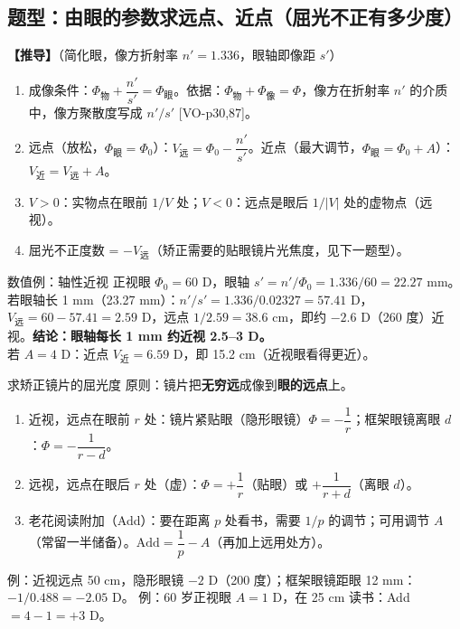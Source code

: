 \subsection{题型：由眼的参数求远点、近点（屈光不正有多少度）}\label{sec:farpoint}
\textbf{【推导】}（简化眼，像方折射率 $n'=1.336$，眼轴即像距 $s'$）
\begin{enumerate}
\item 成像条件：$\Phi_{\text{物}}+\dfrac{n'}{s'}=\Phi_{\text{眼}}$。依据：$\Phi_{\text{物}}+\Phi_{\text{像}}=\Phi$，像方在折射率 $n'$ 的介质中，像方聚散度写成 $n'/s'$ [VO-p30,87]。
\item 远点（放松，$\Phi_{\text{眼}}=\Phi_0$）：$V_{\text{远}}=\Phi_0-\dfrac{n'}{s'}$。近点（最大调节，$\Phi_{\text{眼}}=\Phi_0+A$）：$V_{\text{近}}=V_{\text{远}}+A$。
\item $V>0$：实物点在眼前 $1/V$ 处；$V<0$：远点是眼后 $1/|V|$ 处的虚物点（远视）。
\item 屈光不正度数 = $-V_{\text{远}}$（矫正需要的贴眼镜片光焦度，见下一题型）。
\end{enumerate}
\begin{exam}{数值例：轴性近视}
正视眼 $\Phi_0=60$ D，眼轴 $s'=n'/\Phi_0=1.336/60=22.27$ mm。若眼轴长 1 mm（23.27 mm）：$n'/s'=1.336/0.02327=57.41$ D，$V_{\text{远}}=60-57.41=2.59$ D，远点 $1/2.59=38.6$ cm，即约 $-2.6$ D（260 度）近视。\textbf{结论：眼轴每长 1 mm 约近视 2.5–3 D。}\\
若 $A=4$ D：近点 $V_{\text{近}}=6.59$ D，即 15.2 cm（近视眼看得更近）。
\end{exam}

\begin{recipe}{求矫正镜片的屈光度}\label{sec:correct}
原则：镜片把\textbf{无穷远}成像到\textbf{眼的远点}上。
\begin{enumerate}
\item 近视，远点在眼前 $r$ 处：镜片紧贴眼（隐形眼镜）$\Phi=-\dfrac1r$；框架眼镜离眼 $d$：$\Phi=-\dfrac{1}{r-d}$。
\item 远视，远点在眼后 $r$ 处（虚）：$\Phi=+\dfrac1r$（贴眼）或 $+\dfrac{1}{r+d}$（离眼 $d$）。
\item 老花阅读附加（Add）：要在距离 $p$ 处看书，需要 $1/p$ 的调节；可用调节 $A$（常留一半储备）。$\text{Add}=\dfrac1p-A$（再加上远用处方）。
\end{enumerate}
例：近视远点 50 cm，隐形眼镜 $-2$ D（200 度）；框架眼镜距眼 12 mm：$-1/0.488=-2.05$ D。
例：60 岁正视眼 $A=1$ D，在 25 cm 读书：Add $=4-1=+3$ D。
\end{recipe}

